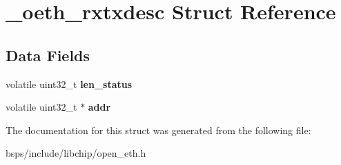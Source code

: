 \hypertarget{struct__oeth__rxtxdesc}{}\section{\+\_\+oeth\+\_\+rxtxdesc Struct Reference}
\label{struct__oeth__rxtxdesc}
\subsection*{Data Fields}
\begin{DoxyCompactItemize}
\item 
\mbox{\label{struct__oeth__rxtxdesc_ad92c8d12712208d9761a4bc931e6b340}} 
volatile uint32\+\_\+t {\bfseries len\+\_\+status}
\item 
\mbox{\label{struct__oeth__rxtxdesc_a16fe2ec551425af4220bc552e6f53326}} 
volatile uint32\+\_\+t $\ast$ {\bfseries addr}
\end{DoxyCompactItemize}


The documentation for this struct was generated from the following file\+:\begin{DoxyCompactItemize}
\item 
bsps/include/libchip/open\+\_\+eth.\+h\end{DoxyCompactItemize}

